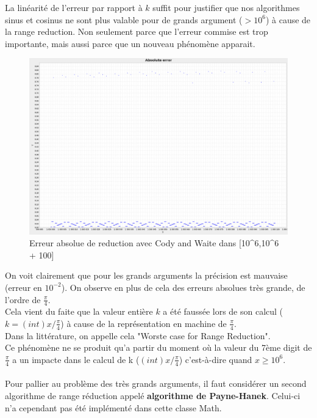 \documentclass[12pt]{article}
\begin{document}
La linéarité de l'erreur par rapport à $k$ suffit pour justifier que nos algorithmes sinus et cosinus
ne sont plus valable pour de grands argument ($> 10^6$) à cause de la range reduction.
Non seulement parce que l'erreur commise est trop
importante, mais aussi parce que un nouveau phénomène apparait.

\begin{figure}[ht]
    \begin{center}
      \includegraphics[scale=0.28]{AbsoluteErrorRangeRedFar.png}
      \caption{Erreur absolue de reduction avec Cody and Waite dans [10^6,10^6 + 100]}
      \label{Erreur absolue de reduction avec Cody and Waite}
    \end{center}
\end{figure}

On voit clairement que pour les grands arguments la précision est mauvaise (erreur en $10^{-2}$). On
observe en plus de cela des erreurs absolues très grande, de l'ordre de $\frac{\pi}{4}$. \\
Cela vient du faite que la valeur entière $k$ a été faussée lors de son calcul ($k = (int) x / \frac{\pi}{4}$)
à cause de la
représentation en machine de $\frac{\pi}{4}$.\\
Dans la littérature, on appelle cela "Worste case for Range Reduction".\\
Ce phénomène ne se produit qu'a partir du moment où la valeur du 7ème digit de $\frac{\pi}{4}$ a un impacte
dans le calcul de k ($(int) x / \frac{\pi}{4}$) c'est-à-dire quand $x \geq 10^6$.
\\
\\
Pour pallier au problème des très grands arguments, il faut considérer un second algorithme de range réduction
appelé \textbf{algorithme de Payne-Hanek}. Celui-ci n'a cependant pas été implémenté dans cette classe Math.
\end{document}
